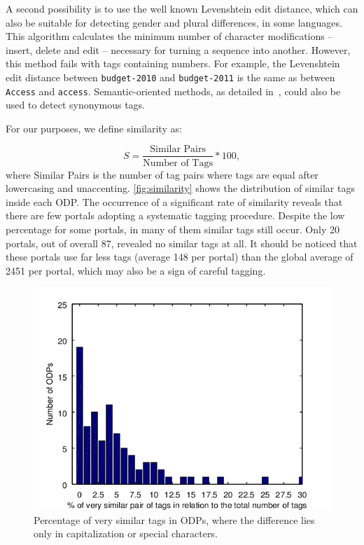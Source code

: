 A second possibility is to use the well known Levenshtein edit distance, which can also be suitable for detecting gender and plural differences, in some languages. 
This algorithm calculates the minimum number of character modifications -- insert, delete and edit -- necessary for turning a sequence into another. 
However, this method fails with tags containing numbers. 
For example, the Levenshtein edit distance between \texttt{budget-2010} and \texttt{budget-2011} is the same as between \texttt{Access} and \texttt{access}.
Semantic-oriented methods, as detailed in~, could also be used to detect synonymous tags.

For our purposes, we define similarity as:

\begin{equation}
	S = \frac{\textrm{Similar Pairs}}{\textrm{Number of Tags}} * 100,
\end{equation}
where Similar Pairs is the number of tag pairs where tags are equal after lowercasing and unaccenting.
\autoref{fig:similarity} shows the distribution of similar tags inside each ODP.
The occurrence of a significant rate of similarity reveals that there are few portals adopting a systematic tagging procedure.
Despite the low percentage for some portals, in many of them similar tags still occur.
Only 20 portals, out of overall 87, revealed no similar tags at all. 
It should be noticed that these portals use far less tags (average 148 per portal) than the global average of 2451 per portal, which may also be a sign of careful tagging.

\begin{figure}[tb]
\begin{center}
\includegraphics[scale=1.2]{images/similarity.png}
\caption[Percentage of very similar tags in ODPs.]{Percentage of very similar tags in ODPs, where the difference lies only in capitalization or special characters.}
\label{fig:similarity}
\end{center}
\end{figure}


